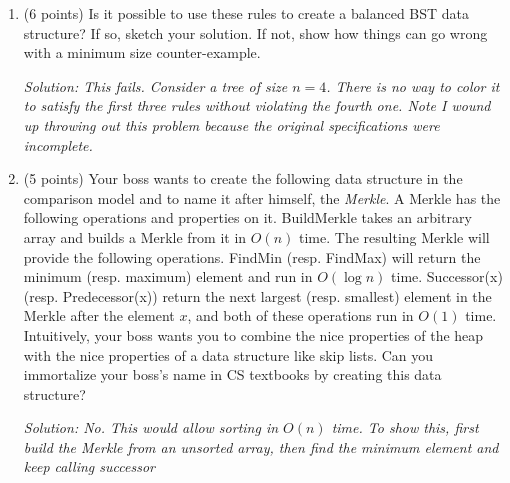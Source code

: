 \documentclass[11pt]{article}
\newcommand{\ans}[1]{\emph{Solution: #1}}
\begin{document}
\begin{enumerate}
\begin{enumerate}
\end{enumerate}

 
 
 \begin{enumerate}
 
Your colleague wants to change the rules of red-black trees to the following:
 \begin{itemize}
\item The root node must be red
\item All other nodes, including leaf nodes (NIL) can be either red or black
\item If a node is red and not a leaf node, both of its children are black
\item If a node is black and not a leaf node, both of its children are red
\item For each node, all paths from the node to descendant leaves contain the same number of black nodes
\end{itemize}
\item (6 points) Is it possible to use these rules to create a balanced BST data structure?  If so, sketch your solution.  If not, show how things can go wrong with a minimum size counter-example.
 
 \ans{This fails.  Consider a tree of size $n=4$.  There is no way to color it to satisfy the first three rules without violating the fourth one.  Note I wound up throwing out this problem because the original specifications were incomplete.}
 
 \pagebreak

\item (5 points) Your boss wants to create the following data structure in the comparison model and to name it after himself, the \emph{Merkle}.  A Merkle has the following operations and properties on it.  BuildMerkle takes an arbitrary array and builds a Merkle from it in $O(n)$ time.  The resulting Merkle will provide the following operations.  FindMin (resp. FindMax) will return the minimum (resp. maximum) element and run in $O(\log n)$ time.  Successor(x) (resp. Predecessor(x)) return the next largest (resp. smallest) element in the Merkle after the element $x$, and both of these operations run in $O(1)$ time.  Intuitively, your boss wants you to combine the nice properties of the heap with the nice properties of a data structure like skip lists.  Can you immortalize your boss's name in CS textbooks by creating this data structure?

\ans{No.  This would allow sorting in $O(n)$ time.  To show this, first build the Merkle from an unsorted array, then find the minimum element and keep calling successor}




\end{enumerate}
\end{enumerate}
\end{document}

